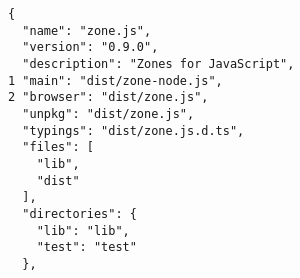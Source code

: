 \begin{verbatim}
{
  "name": "zone.js",
  "version": "0.9.0",
  "description": "Zones for JavaScript",
1 "main": "dist/zone-node.js",
2 "browser": "dist/zone.js",
  "unpkg": "dist/zone.js",
  "typings": "dist/zone.js.d.ts",
  "files": [
    "lib",
    "dist"
  ],
  "directories": {
    "lib": "lib",
    "test": "test"
  },
\end{verbatim}
